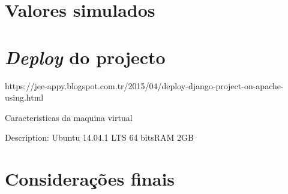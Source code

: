 \section{Valores simulados}



\section{\textit{Deploy} do projecto}


https://jee-appy.blogspot.com.tr/2015/04/deploy-django-project-on-apache-using.html

Caracteristicas da maquina virtual

Description:	Ubuntu 14.04.1 LTS
64 bitsRAM 2GB 

\section{Considerações finais}








